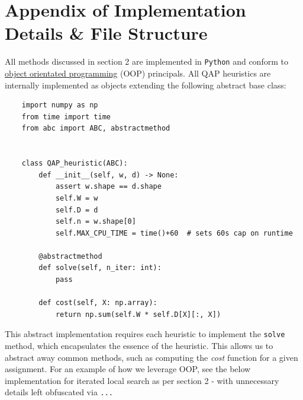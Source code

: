 \documentclass[a4paper,10pt]{article}
\begin{document}
\section{Appendix of Implementation Details \& File Structure}
All methods discussed in section 2 are implemented in \texttt{Python} and conform to \href{https://en.wikipedia.org/wiki/Object-oriented_programming}{object orientated programming} (OOP) principals. All QAP heuristics are internally implemented as objects extending the following abstract base class: 
\begin{verbatim}
    import numpy as np
    from time import time
    from abc import ABC, abstractmethod
    
    
    class QAP_heuristic(ABC):
        def __init__(self, w, d) -> None:
            assert w.shape == d.shape
            self.W = w
            self.D = d
            self.n = w.shape[0]
            self.MAX_CPU_TIME = time()+60  # sets 60s cap on runtime 
    
        @abstractmethod
        def solve(self, n_iter: int):
            pass
    
        def cost(self, X: np.array):
            return np.sum(self.W * self.D[X][:, X])       
\end{verbatim}
This abstract implementation requires each heuristic to implement the \texttt{solve} method, which encapsulates the essence of the heuristic. This allows us to abstract away common methods, such as computing the \textit{cost} function for a given assignment. For an example of how we leverage OOP, see the below implementation for iterated local search as per section 2 - with unnecessary details left obfuscated via \texttt{...}
\end{document}
